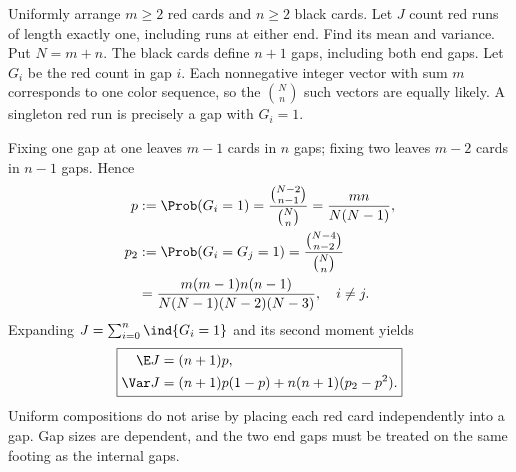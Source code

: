 Uniformly arrange $m\ge2$ red cards and $n\ge2$ black cards. Let $J$ count red runs of length exactly one, including runs at either end. Find its mean and variance.
\solution Put $N=m+n$. The black cards define $n+1$ gaps, including both end gaps. Let $G_i$ be the red count in gap $i$. Each nonnegative integer vector with sum $m$ corresponds to one color sequence, so the $\binom Nn$ such vectors are equally likely. A singleton red run is precisely a gap with $G_i=1$.

Fixing one gap at one leaves $m-1$ cards in $n$ gaps; fixing two leaves $m-2$ cards in $n-1$ gaps. Hence
\[
\begin{aligned}
p&:=\Prob(G_i=1)=\frac{\binom{N-2}{n-1}}{\binom Nn}
=\frac{mn}{N(N-1)},\\
p_2&:=\Prob(G_i=G_j=1)
=\frac{\binom{N-4}{n-2}}{\binom Nn}\\
&=\frac{m(m-1)n(n-1)}{N(N-1)(N-2)(N-3)},\quad i\ne j.
\end{aligned}
\]
Expanding $J=\sum_{i=0}^n\ind\{G_i=1\}$ and its second moment yields
\[
\boxed{\begin{aligned}
\E J&=(n+1)p,\\
\Var J&=(n+1)p(1-p)+n(n+1)(p_2-p^2).
\end{aligned}}
\]
\pitfall Uniform compositions do not arise by placing each red card independently into a gap. Gap sizes are dependent, and the two end gaps must be treated on the same footing as the internal gaps.

